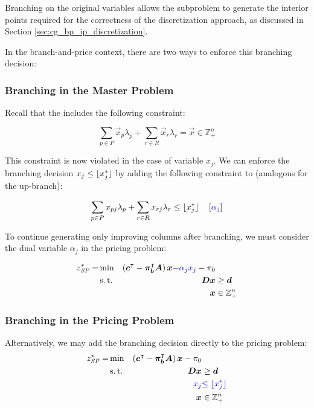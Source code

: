 \begin{note}
Branching on the original variables allows the subproblem to generate the interior points required for the correctness of the discretization approach, as discussed in Section \ref{sec:cg_bp_ip_discretization}.
\end{note}

In the branch-and-price context, there are two ways to enforce this branching decision:

\subsubsection{Branching in the Master Problem}
Recall that the \MP{} includes the following constraint:

\begin{equation}
\sum_{p \in P} \vec{x}_p \lambda_p + \sum_{r \in R} \vec{x}_r \lambda_r = \vec{x} \in \mathbb{Z}_+^n
\end{equation}

This constraint is now violated in the case of variable $x_j$. We can enforce the branching decision $x_j \leq \lfloor x_j^*\rfloor$ by adding the following constraint to \MP{} (analogous for the up-branch):

\begin{equation}
\sum_{p \in P} x_{pj} \lambda_p + \sum_{r \in R} x_{rj} \lambda_r \leq \lfloor x_j^*\rfloor \quad \left[{\color{blue} \alpha_j }\right]
\end{equation}

To continue generating only improving columns after branching, we must consider the dual variable $\alpha_j$ in the pricing problem:

\begin{equation}
\begin{aligned}
z^*_\SP{} = &\min & \left( \vec{c}\transpose - \vec{\pi}_\vec{b}\transpose \mat{A} \right) \vec{x} {\color{blue} - \alpha_j x_j} - \pi_0 & \\
&\st & \mat{D} \vec{x} & \geq \vec{d} \\
&& \vec{x} & \in \mathbb{Z}_+^n
\end{aligned}
\end{equation}

\subsubsection{Branching in the Pricing Problem}
Alternatively, we may add the branching decision directly to the pricing problem:
\begin{equation}
\begin{aligned}
z^*_\SP{} = &\min & \left( \vec{c}\transpose - \vec{\pi}_\vec{b}\transpose \mat{A} \right) \vec{x} - \pi_0 & \\
&\st & \mat{D} \vec{x} & \geq \vec{d} \\
&& {\color{blue} x_j} & {\color{blue} \leq \floor{x_j^*}}\\
&& \vec{x} & \in \mathbb{Z}_+^n
\end{aligned}
\end{equation}

